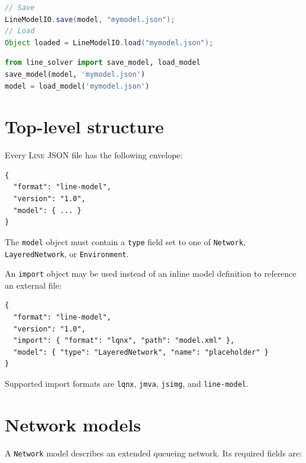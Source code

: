 \begin{JAVA}
\begin{lstlisting}[language=java,basicstyle=\ttfamily\scriptsize]
// Save
LineModelIO.save(model, "mymodel.json");
// Load
Object loaded = LineModelIO.load("mymodel.json");
\end{lstlisting}
\end{JAVA}

\begin{PYTHON}
\begin{lstlisting}[language=python,basicstyle=\ttfamily\scriptsize]
from line_solver import save_model, load_model
save_model(model, 'mymodel.json')
model = load_model('mymodel.json')
\end{lstlisting}
\end{PYTHON}

\section{Top-level structure}
\label{json:toplevel}

Every \textsc{Line} JSON file has the following envelope:
\begin{lstlisting}[basicstyle=\ttfamily\scriptsize]
{
  "format": "line-model",
  "version": "1.0",
  "model": { ... }
}
\end{lstlisting}
The \texttt{model} object must contain a \texttt{type} field set to one of \texttt{Network}, \texttt{LayeredNetwork}, or \texttt{Environment}.

An \texttt{import} object may be used instead of an inline model definition to reference an external file:
\begin{lstlisting}[basicstyle=\ttfamily\scriptsize]
{
  "format": "line-model",
  "version": "1.0",
  "import": { "format": "lqnx", "path": "model.xml" },
  "model": { "type": "LayeredNetwork", "name": "placeholder" }
}
\end{lstlisting}
Supported import formats are \texttt{lqnx}, \texttt{jmva}, \texttt{jsimg}, and \texttt{line-model}.

\section{Network models}
\label{json:network}

A \texttt{Network} model describes an extended queueing network. Its required fields are:

